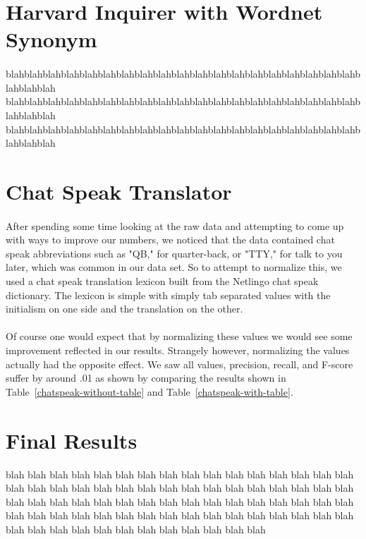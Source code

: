 \documentclass[11pt,letterpaper]{article}
\begin{document}
\section{Harvard Inquirer with Wordnet Synonym}
\paragraph{}
blahblahblahblahblahblahblahblahblahblahblahblahblahblahblahblahblahblahblahblahblahblah
blahblahblahblahblahblahblahblahblahblahblahblahblahblahblahblahblahblahblahblahblahblah
blahblahblahblahblahblahblahblahblahblahblahblahblahblahblahblahblahblahblahblahblahblah

\section{Chat Speak Translator}
\paragraph{}
After spending some time looking at the raw data and attempting to come up with ways to improve our numbers, we noticed that the data contained chat speak abbreviations such as "QB," for quarter-back, or "TTY," for talk to you later, which was common in our data set. So to attempt to normalize this, we used a chat speak translation lexicon built from the Netlingo chat speak dictionary. The lexicon is simple with simply tab separated values with the initialism on one side and the translation on the other.
\paragraph{}
Of course one would expect that by normalizing these values we would see some improvement reflected in our results. Strangely however, normalizing the values actually had the opposite effect. We saw all values, precision, recall, and F-score suffer by around .01 as shown by comparing the results shown in Table~\ref{chatspeak-without-table} and Table~\ref{chatspeak-with-table}.



\section{Final Results}
blah blah blah blah blah blah blah blah blah blah blah blah blah blah blah blah blah blah blah 
blah blah blah blah blah blah blah blah blah blah blah blah blah blah blah blah blah blah blah 
blah blah blah blah blah blah blah blah blah blah blah blah blah blah blah blah blah blah blah 
blah blah blah blah blah blah blah blah blah blah blah blah blah blah blah blah blah blah blah 
\end{document}
